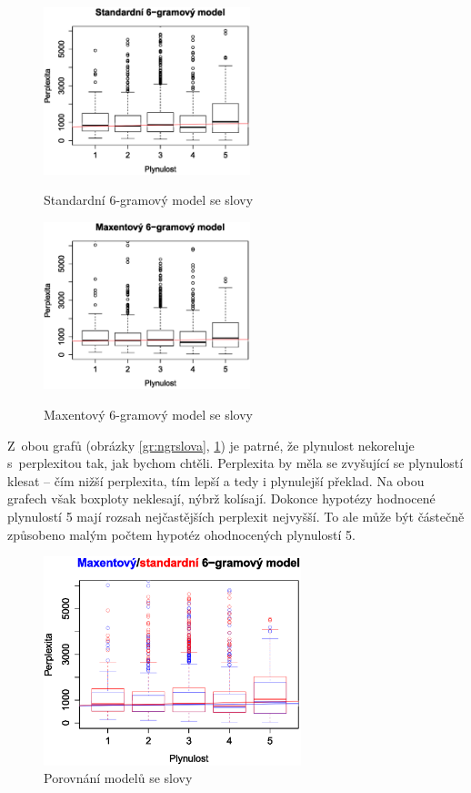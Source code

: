 \documentclass[12pt,a4paper]{report}
\begin{document}
\begin{figure}[!htb]
\begin{center}
  \centering\includegraphics[width=60mm]{./grafy/morf/ngram/text.svg.eps}
  \caption{Standardní 6-gramový model se slovy}\label{gr:ngrslova}
\endminipage\quad
{}
  \centering\includegraphics[width=60mm]{./grafy/morf/maxent/text.svg.eps}
  \caption{Maxentový 6-gramový model se slovy}\label{gr:maxslova}
\endminipage
\end{center}
\end{figure}




Z~obou grafů (obrázky \ref{gr:ngrslova}, \ref{gr:maxslova}) je patrné, že plynulost nekoreluje s~perplexitou tak, jak bychom chtěli. Perplexita by měla se zvyšující se plynulostí klesat -- čím nižší perplexita, tím lepší a tedy i plynulejší překlad. Na obou grafech však box\-ploty neklesají, nýbrž kolísají. Dokonce hypotézy hodnocené plynulostí 5 mají rozsah nejčastějších perplexit nejvyšší. To ale může být částečně způsobeno malým počtem hypotéz ohodnocených plynulostí 5.


\begin{figure}[!htbp]
\begin{center}
	\centering
	\includegraphics[width=75mm]{./grafy/morf/porovnani/text.svg.eps}
	\caption{Porovnání modelů se slovy}\label{gr:porslova}
\endminipage
\end{center}
\end{figure}
\end{document}
